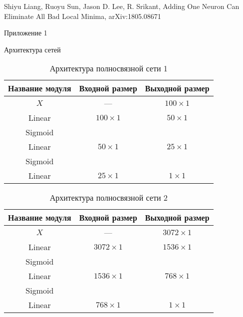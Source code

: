 \documentclass[a4paper,12pt,titlepage,finall]{article}
\begin{document}
\begin{thebibliography}{9} 
	 Shiyu Liang, Ruoyu Sun, Jason D. Lee, R. Srikant, Adding One Neuron Can Eliminate All Bad Local Minima, arXiv:1805.08671
\end{thebibliography}

\begin{section}{Приложение 1}
\begin{subsection}{Архитектура сетей}
	
	\begin{table}[H]
		\centering
		\begin{tabular}{ccc}
			\hline
			Название модуля & Входной размер & Выходной размер \\
			\hline
			$X$ & --- & $100 \times 1$ \\
			Linear & $100 \times 1$ & $50 \times 1$ \\
			Sigmoid & & \\
			Linear & $50 \times 1$ & $25 \times 1$ \\
			Sigmoid & & \\
			Linear & $25 \times 1$ & $1 \times 1$ \\
			\hline
		\end{tabular}
		\caption{\label{tabular:4}Архитектура полносвязной сети 1}
	\end{table}	
	
	\begin{table}[H]
		\centering
		\begin{tabular}{ccc}
			\hline
			Название модуля & Входной размер & Выходной размер \\
			\hline
			$X$ & --- & $3072 \times 1$ \\
			Linear & $3072 \times 1$ & $1536 \times 1$ \\
			Sigmoid & & \\
			Linear & $1536 \times 1$ & $768 \times 1$ \\
			Sigmoid & & \\
			Linear & $768 \times 1$ & $1 \times 1$ \\
			\hline
		\end{tabular}
		\caption{\label{tabular:5}Архитектура полносвязной сети 2}
	\end{table}
	

\end{subsection}
\end{section}
\end{document}
